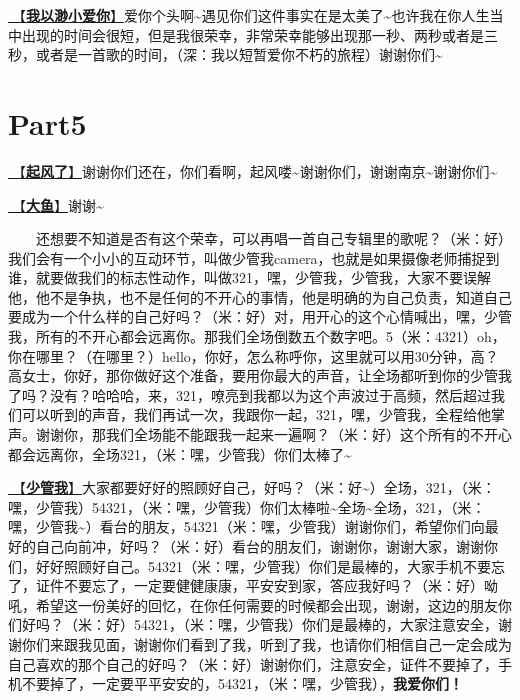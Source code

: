 \documentclass[]{ctexbook}
\begin{document}
\hyperref[loving-you-in-my-humble-way]{🎵【\textbf{我以渺小爱你}】}爱你个头啊\textasciitilde 遇见你们这件事实在是太美了\textasciitilde 也许我在你人生当中出现的时间会很短，但是我很荣幸，非常荣幸能够出现那一秒、两秒或者是三秒，或者是一首歌的时间，（深：我以短暂爱你不朽的旅程）谢谢你们\textasciitilde{}

\section{Part5}\label{nanjing-20240811-part5}

\hyperref[the-wind-rises]{🎵【\textbf{起风了}】}谢谢你们还在，你们看啊，起风喽\textasciitilde 谢谢你们，谢谢南京\textasciitilde 谢谢你们\textasciitilde{}

\hyperref[big-fish]{🎵【\textbf{大鱼}】}谢谢\textasciitilde{}

  还想要不知道是否有这个荣幸，可以再唱一首自己专辑里的歌呢？（米：好）我们会有一个小小的互动环节，叫做少管我camera，也就是如果摄像老师捕捉到谁，就要做我们的标志性动作，叫做321，嘿，少管我，少管我，大家不要误解他，他不是争执，也不是任何的不开心的事情，他是明确的为自己负责，知道自己要成为一个什么样的自己好吗？（米：好）对，用开心的这个心情喊出，嘿，少管我，所有的不开心都会远离你。那我们全场倒数五个数字吧。5（米：4321）oh，你在哪里？（在哪里？）hello，你好，怎么称呼你，这里就可以用30分钟，高？高女士，你好，那你做好这个准备，要用你最大的声音，让全场都听到你的少管我了吗？没有？哈哈哈，来，321，嘹亮到我都以为这个声波过于高频，然后超过我们可以听到的声音，我们再试一次，我跟你一起，321，嘿，少管我，全程给他掌声。谢谢你，那我们全场能不能跟我一起来一遍啊？（米：好）这个所有的不开心都会远离你，全场321，（米：嘿，少管我）你们太棒了\textasciitilde{}

\hyperref[watch-ur-manners]{🎵【\textbf{少管我}】}大家都要好好的照顾好自己，好吗？（米：好\textasciitilde）全场，321，（米：嘿，少管我）54321，（米：嘿，少管我）你们太棒啦\textasciitilde 全场\textasciitilde 全场，321，（米：嘿，少管我\textasciitilde）看台的朋友，54321（米：嘿，少管我）谢谢你们，希望你们向最好的自己向前冲，好吗？（米：好）看台的朋友们，谢谢你，谢谢大家，谢谢你们，好好照顾好自己。54321（米：嘿，少管我）你们是最棒的，大家手机不要忘了，证件不要忘了，一定要健健康康，平安安到家，答应我好吗？（米：好）呦吼，希望这一份美好的回忆，在你任何需要的时候都会出现，谢谢，这边的朋友你们好吗？（米：好）54321，（米：嘿，少管我）你们是最棒的，大家注意安全，谢谢你们来跟我见面，谢谢你们看到了我，听到了我，也请你们相信自己一定会成为自己喜欢的那个自己的好吗？（米：好）谢谢你们，注意安全，证件不要掉了，手机不要掉了，一定要平平安安的，54321，（米：嘿，少管我），\textbf{我爱你们！}
\end{document}
